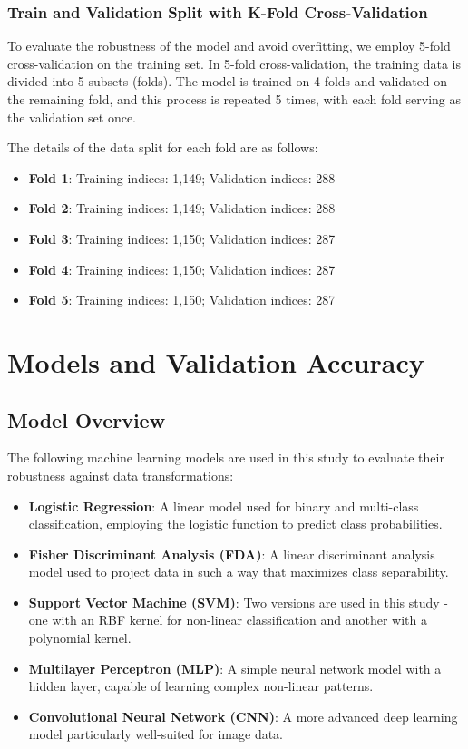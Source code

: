 \documentclass{article}
\begin{document}
\subsubsection{Train and Validation Split with K-Fold Cross-Validation}
To evaluate the robustness of the model and avoid overfitting, we employ 5-fold cross-validation on the training set. In 5-fold cross-validation, the training data is divided into 5 subsets (folds). The model is trained on 4 folds and validated on the remaining fold, and this process is repeated 5 times, with each fold serving as the validation set once.

The details of the data split for each fold are as follows:

\begin{itemize}
    \item \textbf{Fold 1}: Training indices: 1,149; Validation indices: 288
    \item \textbf{Fold 2}: Training indices: 1,149; Validation indices: 288
    \item \textbf{Fold 3}: Training indices: 1,150; Validation indices: 287
    \item \textbf{Fold 4}: Training indices: 1,150; Validation indices: 287
    \item \textbf{Fold 5}: Training indices: 1,150; Validation indices: 287
\end{itemize}

\section{Models and Validation Accuracy}

\subsection{Model Overview}
The following machine learning models are used in this study to evaluate their robustness against data transformations:

\begin{itemize}
    \item \textbf{Logistic Regression}: A linear model used for binary and multi-class classification, employing the logistic function to predict class probabilities.
    \item \textbf{Fisher Discriminant Analysis (FDA)}: A linear discriminant analysis model used to project data in such a way that maximizes class separability.
    \item \textbf{Support Vector Machine (SVM)}: Two versions are used in this study - one with an RBF kernel for non-linear classification and another with a polynomial kernel.
    \item \textbf{Multilayer Perceptron (MLP)}: A simple neural network model with a hidden layer, capable of learning complex non-linear patterns.
    \item \textbf{Convolutional Neural Network (CNN)}: A more advanced deep learning model particularly well-suited for image data.
\end{itemize}
\end{document}
